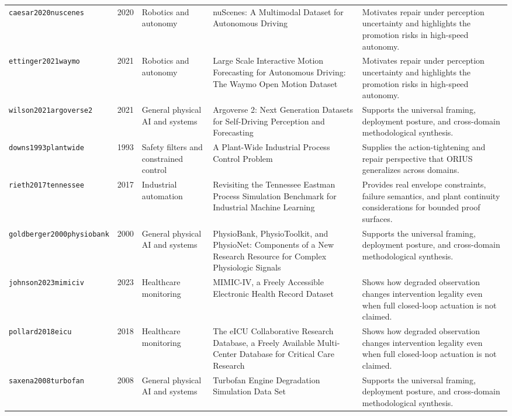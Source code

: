 \begin{longtable}{p{}p{}p{}p{}p{}}
\texttt{caesar2020nuscenes} & 2020 & Robotics and autonomy & nuScenes: A Multimodal Dataset for Autonomous Driving & Motivates repair under perception uncertainty and highlights the promotion risks in high-speed autonomy.\\
\texttt{ettinger2021waymo} & 2021 & Robotics and autonomy & Large Scale Interactive Motion Forecasting for Autonomous Driving: The Waymo Open Motion Dataset & Motivates repair under perception uncertainty and highlights the promotion risks in high-speed autonomy.\\
\texttt{wilson2021argoverse2} & 2021 & General physical AI and systems & Argoverse 2: Next Generation Datasets for Self-Driving Perception and Forecasting & Supports the universal framing, deployment posture, and cross-domain methodological synthesis.\\
\texttt{downs1993plantwide} & 1993 & Safety filters and constrained control & A Plant-Wide Industrial Process Control Problem & Supplies the action-tightening and repair perspective that ORIUS generalizes across domains.\\
\texttt{rieth2017tennessee} & 2017 & Industrial automation & Revisiting the Tennessee Eastman Process Simulation Benchmark for Industrial Machine Learning & Provides real envelope constraints, failure semantics, and plant continuity considerations for bounded proof surfaces.\\
\texttt{goldberger2000physiobank} & 2000 & General physical AI and systems & PhysioBank, PhysioToolkit, and PhysioNet: Components of a New Research Resource for Complex Physiologic Signals & Supports the universal framing, deployment posture, and cross-domain methodological synthesis.\\
\texttt{johnson2023mimiciv} & 2023 & Healthcare monitoring & MIMIC-IV, a Freely Accessible Electronic Health Record Dataset & Shows how degraded observation changes intervention legality even when full closed-loop actuation is not claimed.\\
\texttt{pollard2018eicu} & 2018 & Healthcare monitoring & The eICU Collaborative Research Database, a Freely Available Multi-Center Database for Critical Care Research & Shows how degraded observation changes intervention legality even when full closed-loop actuation is not claimed.\\
\texttt{saxena2008turbofan} & 2008 & General physical AI and systems & Turbofan Engine Degradation Simulation Data Set & Supports the universal framing, deployment posture, and cross-domain methodological synthesis.\\

\end{longtable}
